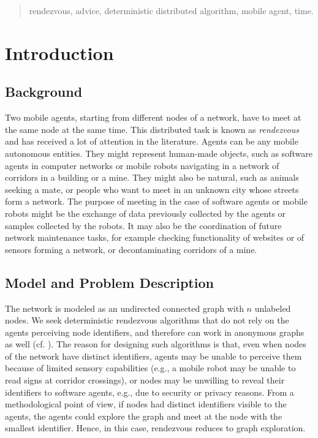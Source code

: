 \documentclass{llncs}
\begin{document}
\begin{abstract}
\vspace{2ex}

 rendezvous, advice, deterministic distributed algorithm, mobile agent, time. 
\end{abstract}

\vspace{2ex}


\vfill

\thispagestyle{empty}
\pagebreak


\section{Introduction}


\subsection{Background}

Two mobile agents, starting from different nodes of a network, have to meet at the same node at the same time.
This distributed task is known as {\em rendezvous} and has received a lot of attention in the literature.
Agents can be any mobile autonomous entities. They might represent human-made objects, such as software agents in computer networks or mobile robots navigating in a network of corridors in a building or a mine. They might also be natural, such as animals seeking a mate,
or people who want to meet in an unknown city whose streets form a network. 
The purpose of meeting in the case of software agents or mobile robots might be the exchange of data previously collected by the agents
or samples collected by the robots. It may also be the coordination
of future network maintenance tasks, for example checking functionality of websites or of sensors forming a network, or decontaminating corridors of a mine.

\subsection{Model and Problem Description}

The network is modeled as an undirected connected graph with $n$ unlabeled nodes.
We seek deterministic rendezvous algorithms that do not
rely on the agents perceiving node identifiers, and therefore can work in anonymous graphs as well  (cf. \cite{alpern02b}). 
The reason for designing such algorithms
is that, even when nodes of the network have distinct identifiers, agents may be unable to perceive them
because of limited sensory capabilities (e.g., a mobile robot may be unable to read signs at corridor crossings), 
or nodes may be unwilling to reveal their identifiers to software agents, e.g., due to security or privacy reasons.
From a methodological point of view, if nodes had distinct identifiers visible to the agents, the agents could explore the graph and meet at the node
with the smallest identifier. Hence, in this case, rendezvous
reduces to graph exploration.
\end{document}
